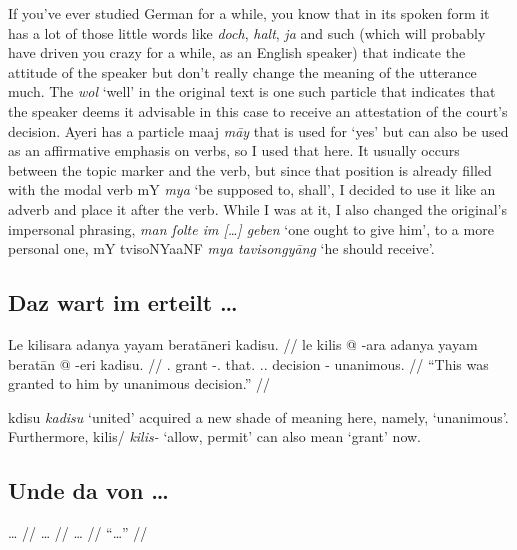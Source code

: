 \documentclass[12pt,paper=a4]{scrartcl}
\newcommand{\fw}[1]{\textit{#1}} %
\newcommand{\ayr}[1]{{\Tagati #1}}
\newcommand{\xayr}[3]{{\Tagati #1} \emph{#2} \enquote*{#3}}
\begin{document}
If you've ever studied German for a while, you know that in its spoken form it 
has a lot of those little words like \fw{doch}, \fw{halt}, \fw{ja} and such 
(which will probably have driven you crazy for a while, as an English speaker) 
that indicate the attitude of the speaker but don't really change the meaning of 
the utterance much. The \fw{wol} `well' in the \Mhg{} original text is one such 
particle that indicates that the speaker deems it advisable in this case to 
receive an attestation of the court's decision. Ayeri has a particle \ayr{maaj} 
\fw{māy} that is used for `yes' but can also be used as an affirmative emphasis 
on verbs, so I used that here. It usually occurs between the topic marker and 
the verb, but since that position is already filled with the modal verb 
\xayr{mY}{mya}{be supposed to, shall}, I decided to use it like an adverb and 
place it after the verb. While I was at it, I also changed the original's 
impersonal phrasing, \fw{man ſolte im […] geben} `one ought to give him', to 
a more personal one, \xayr{mY tvisoNYaaNF}{mya tavisongyāng}{he should receive}.

\subsection*{Daz wart im erteilt …}


\ex \begingl
	\glpreamble Le kilisara adanya yayam beratāneri kadisu. //
	\gla le kilis @ -ara adanya yayam beratān @ -eri kadisu. //
	\glb \PatT{}.\Inan{} grant -\Tsg{}.\Inan{} that.\Top{} 
		\Tsg{}.\M{}.\Dat{} decision -\Ins{} unanimous. //
	\glft \enquote{This was granted to him by unanimous decision.} //
\endgl \xe

\xayr{kdisu}{kadisu}{united} acquired a new shade of meaning here, namely, 
`unanimous'. Furthermore, \xayr{kilis/}{kilis-}{allow, permit} can also mean 
`grant' now.

\subsection*{Unde da von …}


\ex \begingl
	\glpreamble … //
	\gla … //
	\glb … //
	\glft \enquote{…} //
\endgl \xe
\end{document}
